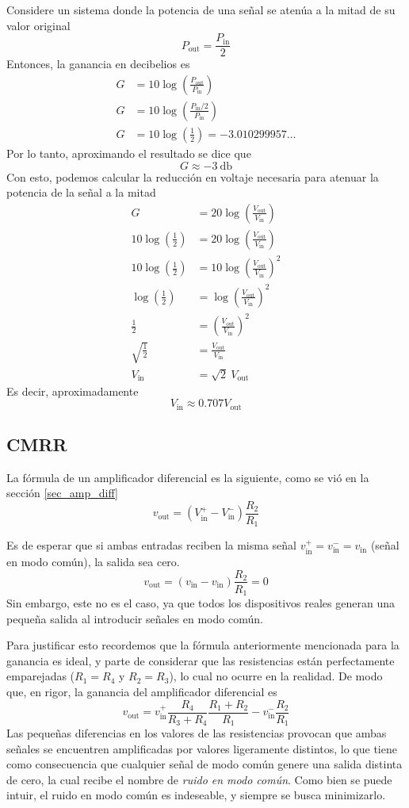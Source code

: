 Considere un sistema donde la potencia de una señal se atenúa a la mitad de su valor original 
\[
  P_\text{out}=\frac{P_\text{in}}{2}
\]
Entonces, la ganancia en decibelios es 
\begin{align*}
  G&=10\log\left(\frac{P_\text{out}}{P_\text{in}}\right) \\
  G&=10\log\left(\frac{P_\text{in}/2}{P_\text{in}}\right) \\
  G&=10\log\left(\frac{1}{2}\right) = -3.010299957\dots
\end{align*}
Por lo tanto, aproximando el resultado se dice que 
\[
  G\approx \qty{-3}{\decibel}
\]
Con esto, podemos calcular la reducción en voltaje necesaria para atenuar la potencia de la señal a la mitad
{\allowdisplaybreaks
\begin{align*}
  G&=20\log\left(\frac{V_\text{out}}{V_\text{in}}\right)\\
  10\log\left(\frac{1}{2}\right)&=20\log\left(\frac{V_\text{out}}{V_\text{in}}\right)\\
  10\log\left(\frac{1}{2}\right)&=10\log\left(\frac{V_\text{out}}{V_\text{in}}\right)^2\\
  \log\left(\frac{1}{2}\right)&=\log\left(\frac{V_\text{out}}{V_\text{in}}\right)^2\\
  \frac{1}{2}&=\left(\frac{V_\text{out}}{V_\text{in}}\right)^2\\
  \sqrt{\frac{1}{2}}&=\frac{V_\text{out}}{V_\text{in}} \\
  V_\text{in}&=\sqrt{2}~V_\text{out}
\end{align*}
}
Es decir, aproximadamente
\[
  V_\text{in}\approx0.707 V_\text{out}
\]

\subsection{CMRR}

La fórmula de un amplificador diferencial es la siguiente, como se vió en la sección \ref{sec_amp_diff}
\[
  v_\text{out} = (V_\text{in}^+-V_\text{in}^-)\frac{R_2}{R_1}
\]

Es de esperar que si ambas entradas reciben la misma señal \(v_\text{in}^+=v_\text{in}^-=v_\text{in}\) (señal en modo común), la salida sea cero.
\[
  v_\text{out} = (v_\text{in}-v_\text{in})\frac{R_2}{R_1}= 0
\]
Sin embargo, este no es el caso, ya que todos los dispositivos reales generan una pequeña salida al introducir señales en modo común.

Para justificar esto recordemos que la fórmula anteriormente mencionada para la ganancia es ideal, y parte de considerar que las resistencias están perfectamente emparejadas (\(R_1=R_4\) y \(R_2=R_3\)), lo cual no ocurre en la realidad. De modo que, en rigor, la ganancia del amplificador diferencial es 
\[
  v_\text{out}= v_\text{in}^+ \frac{R_4}{R_3+R_4}\frac{R_1+R_2}{R_1} - v_\text{in}^-\frac{R_2}{R_1}
\]
Las pequeñas diferencias en los valores de las resistencias provocan que ambas señales se encuentren amplificadas por valores ligeramente distintos, lo que tiene como consecuencia que cualquier señal de modo común genere una salida distinta de cero, la cual recibe el nombre de \emph{ruido en modo común}. Como bien se puede intuir, el ruido en modo común es indeseable, y siempre se busca minimizarlo.

